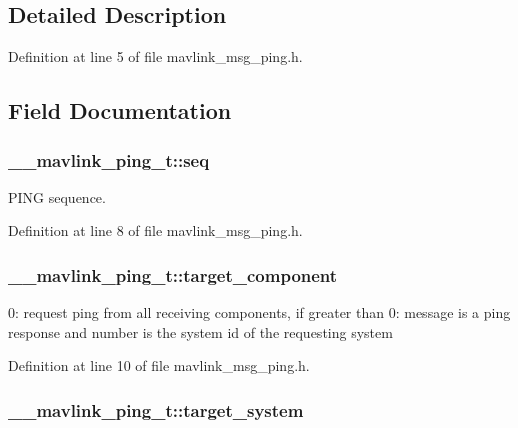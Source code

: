 \subsection{Detailed Description}


Definition at line 5 of file mavlink\-\_\-msg\-\_\-ping.\-h.



\subsection{Field Documentation}
\hypertarget{struct____mavlink__ping__t_a753c4aa80232a414c05065646175bf46}{
\subsubsection[{seq}]{ \-\_\-\-\_\-mavlink\-\_\-ping\-\_\-t\-::seq}}\label{struct____mavlink__ping__t_a753c4aa80232a414c05065646175bf46}


P\-I\-N\-G sequence. 



Definition at line 8 of file mavlink\-\_\-msg\-\_\-ping.\-h.

\hypertarget{struct____mavlink__ping__t_aea8c79743c35ac8e9d3d3362e2723f17}{
\subsubsection[{target\-\_\-component}]{ \-\_\-\-\_\-mavlink\-\_\-ping\-\_\-t\-::target\-\_\-component}}\label{struct____mavlink__ping__t_aea8c79743c35ac8e9d3d3362e2723f17}


0\-: request ping from all receiving components, if greater than 0\-: message is a ping response and number is the system id of the requesting system 



Definition at line 10 of file mavlink\-\_\-msg\-\_\-ping.\-h.

\hypertarget{struct____mavlink__ping__t_a349dd7a0a95dc0a9faef1a498172efe3}{
\subsubsection[{target\-\_\-system}]{ \-\_\-\-\_\-mavlink\-\_\-ping\-\_\-t\-::target\-\_\-system}}\label{struct____mavlink__ping__t_a349dd7a0a95dc0a9faef1a498172efe3}


